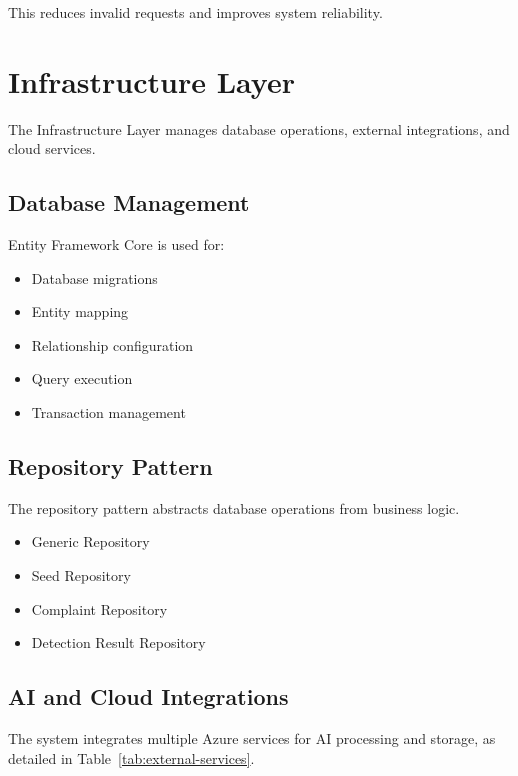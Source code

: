 This reduces invalid requests and improves system reliability.

\section{Infrastructure Layer}
\label{sec:infrastructure-layer}

The Infrastructure Layer manages database operations, external integrations, and cloud services.

\subsection{Database Management}

Entity Framework Core is used for:

\begin{itemize}
    \item Database migrations
    \item Entity mapping
    \item Relationship configuration
    \item Query execution
    \item Transaction management
\end{itemize}

\subsection{Repository Pattern}

The repository pattern abstracts database operations from business logic.

\begin{itemize}
    \item Generic Repository
    \item Seed Repository
    \item Complaint Repository
    \item Detection Result Repository
\end{itemize}

\subsection{AI and Cloud Integrations}

The system integrates multiple Azure services for AI processing and storage, as detailed in Table~\ref{tab:external-services}.

